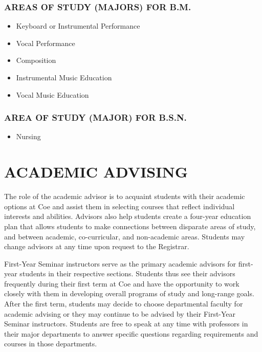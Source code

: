 \documentclass[
  letterpaper,
]{scrbook}
\providecommand{\tightlist}{%
  \setlength{\itemsep}{0pt}\setlength{\parskip}{0pt}}
\begin{document}
\subsection{AREAS OF STUDY (MAJORS) FOR
B.M.}\label{areas-of-study-majors-for-b.m.}

\begin{itemize}
\tightlist
\item
  Keyboard or Instrumental Performance
\item
  Vocal Performance
\item
  Composition
\item
  Instrumental Music Education
\item
  Vocal Music Education
\end{itemize}

\subsection{AREA OF STUDY (MAJOR) FOR
B.S.N.}\label{area-of-study-major-for-b.s.n.}

\begin{itemize}
\tightlist
\item
  Nursing
\end{itemize}

\chapter{ACADEMIC ADVISING}\label{sec-academic-advising}

The role of the academic advisor is to acquaint students with their
academic options at Coe and assist them in selecting courses that
reflect individual interests and abilities. Advisors also help students
create a four-year education plan that allows students to make
connections between disparate areas of study, and between academic,
co-curricular, and non-academic areas. Students may change advisors at
any time upon request to the Registrar.

First-Year Seminar instructors serve as the primary academic advisors
for first-year students in their respective sections. Students thus see
their advisors frequently during their first term at Coe and have the
opportunity to work closely with them in developing overall programs of
study and long-range goals. After the first term, students may decide to
choose departmental faculty for academic advising or they may continue
to be advised by their First-Year Seminar instructors. Students are free
to speak at any time with professors in their major departments to
answer specific questions regarding requirements and courses in those
departments.
\end{document}
